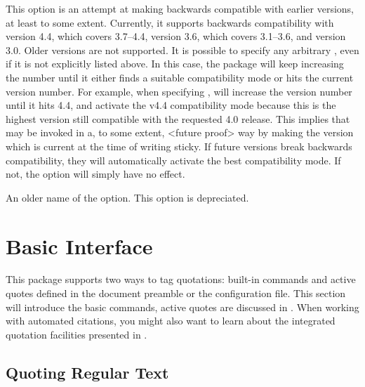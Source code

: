 \documentclass{ltxdockit}[2010/09/26]
\begin{document}
\begin{optionlist}


This option is an attempt at making  backwards compatible with earlier versions, at least to some extent. Currently, it supports backwards compatibility with version 4.4, which covers 3.7--4.4, version 3.6, which covers 3.1--3.6, and version 3.0. Older versions are not supported. It is possible to specify any arbitrary , even if it is not explicitly listed above. In this case, the package will keep increasing the  number until it either finds a suitable compatibility mode or hits the current version number. For example, when specifying ,  will increase the version number until it hits 4.4, and activate the v4.4 compatibility mode because this is the highest version still compatible with the requested 4.0 release. This implies that  may be invoked in a, to some extent, <future proof> way by making the version which is current at the time of writing sticky. If future versions break backwards compatibility, they will automatically activate the best compatibility mode. If not, the  option will simply have no effect.


An older name of the  option. This option is depreciated.

\end{optionlist}

\section{Basic Interface}
\label{bas}

This package supports two ways to tag quotations: built-in commands and active quotes defined in the document preamble or the configuration file. This section will introduce the basic commands, active quotes are discussed in . When working with automated citations, you might also want to learn about the integrated quotation facilities presented in .

\subsection{Quoting Regular Text}
\label{bas:reg}
\end{document}
